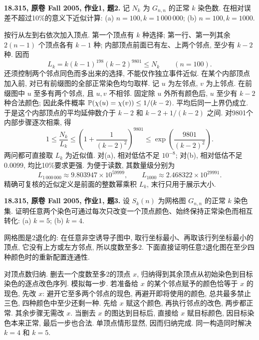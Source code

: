 \begin{exercise}\label{mit:18315-hw1-q2}
\textbf{18.315, 原卷 Fall 2005, 作业1, 题2.}
记 $N_k$ 为 $G_{n,n}$ 的正常 $k$ 染色数. 在相对误差不超过10\%的意义下近似计算:
(a) $n=100,k=1\,000\,000$; (b) $n=100,k=1000$.
\end{exercise}
\begin{solution}
按行从左到右依次加入顶点. 第一个顶点有 $k$ 种选择;
第一行、第一列其余 $2(n-1)$ 个顶点各有 $k-1$ 种;
内部顶点前面已有左、上两个邻点, 至少有 $k-2$ 种. 因而
\[
L_k=k(k-1)^{198}(k-2)^{9801}\le N_k \qquad(n=100).
\]
还须控制两个邻点同色而多出来的选择, 不能仅作独立事件近似.
在某个内部顶点加入前, 对已有前缀图的全部正常染色均匀取样.
记 $u$ 为左邻点, $v$ 为上邻点. 在前缀图中 $u$ 至多有两个邻点,
且 $u,v$ 不相邻. 固定除 $u$ 外所有颜色后, $u$ 至少有 $k-2$ 种合法颜色;
因此条件概率 $\mathbb P(\chi(u)=\chi(v))\le1/(k-2)$.
平均后同一上界仍成立. 于是这个内部顶点的平均延伸数介于
$k-2$ 和 $k-2+1/(k-2)$ 之间. 对9801个内部步骤逐次相乘, 得
\[
1\le \frac{N_k}{L_k}
\le\left(1+\frac1{(k-2)^2}\right)^{9801}
\le\exp\!\left(\frac{9801}{(k-2)^2}\right).
\]
两问都可直接取 $L_k$ 为近似值. 对(a), 相对低估不足 $10^{-8}$;
对(b), 相对低估不足 $0.0099$, 均比10\%要求更强.
为便于读数, 其数量级分别为
\[
L_{1\,000\,000}\approx9.803947\times10^{59999},\qquad
L_{1000}\approx2.468322\times10^{29991}.
\]
精确可复核的近似定义是前面的整数幂乘积 $L_k$, 末行只用于展示大小.
\end{solution}

\begin{exercise}\label{mit:18315-hw1-q3}
\textbf{18.315, 原卷 Fall 2005, 作业1, 题3.}
设 $S_k(n)$ 为网格图 $G_{n,n}$ 的正常 $k$ 染色集.
证明任意两个染色可通过每次只改变一个顶点颜色、始终保持正常染色而相互转化:
(a) $k=5$; (b) $k=4$.
\end{exercise}
\begin{solution}
网格图是2退化的: 在任意非空诱导子图中, 取行坐标最小、再取该行列坐标最小的顶点,
它没有上方或左方邻点, 所以度数至多2.
下面直接证明任意2退化图在至少四种颜色时的重新配置连通性.

对顶点数归纳. 删去一个度数至多2的顶点 $x$,
归纳得到其余顶点从初始染色到目标染色的逐点改色序列.
模拟每一步. 若准备给 $x$ 的某个邻点赋予的颜色恰等于 $x$ 的现色,
先改 $x$: 避开它至多两个邻点的现色, 再避开即将使用的颜色,
总共最多禁止三色, 四种颜色中至少还剩一种.
先给 $x$ 赋这个颜色, 再执行邻点的改色, 两步都正常.
其余步骤无需改 $x$. 当删去 $x$ 的图达到目标后,
直接给 $x$ 赋目标颜色, 因目标染色本来正常, 最后一步也合法.
单顶点情形显然, 因而归纳完成. 同一构造同时解决 $k=4$ 和 $k=5$.
\end{solution}

